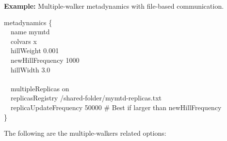 \noindent\textbf{Example:} Multiple-walker metadynamics with file-based communication.\\
\begin{cvexampleinput}
\-metadynamics \{\\
\-\-~~name mymtd\\
\-\-~~colvars x\\
\-\-~~hillWeight 0.001\\
\-\-~~newHillFrequency 1000\\
\-\-~~hillWidth 3.0\\
\-\-~~\\
\-\-~~multipleReplicas       on\\
\-\-~~replicasRegistry       /shared-folder/mymtd-replicas.txt\\
\-\-~~replicaUpdateFrequency 50000  \# Best if larger than newHillFrequency\\
\-\}
\end{cvexampleinput}

The following are the multiple-walkers related options:

